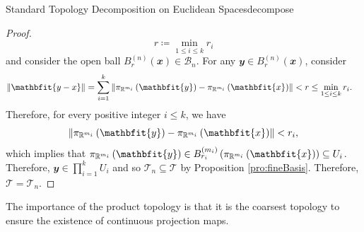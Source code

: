 \documentclass[math]{amznotes}
\theoremstyle{remark}
\begin{document}
\begin{probox}{Standard Topology Decomposition on Euclidean Spaces}{decompose}
\begin{proof}
        \begin{equation*}
            r \coloneqq \min_{1 \leq i \leq k}r_i
        \end{equation*}
        and consider the open ball $B_r^{\left(n\right)}\left(\mathbfit{x}\right) \in \mathcal{B}_n$. For any $\mathbfit{y} \in B_r^{\left(n\right)}\left(\mathbfit{x}\right)$, consider 
        \begin{align*}
            \norm{\mathbfit{y - x}} & = \sum_{i = 1}^{k}\norm{\pi_{\R^{m_i}}\left(\mathbfit{y}\right) - \pi_{\R^{m_i}}\left(\mathbfit{x}\right)} < r \leq \min_{1 \leq i \leq k}r_i.
        \end{align*}
        Therefore, for every positive integer $i \leq k$, we have 
        \begin{equation*}
            \norm{\pi_{\R^{m_i}}\left(\mathbfit{y}\right) - \pi_{\R^{m_i}}\left(\mathbfit{x}\right)} < r_i,
        \end{equation*}
        which implies that $\pi_{\R^{m_i}}\left(\mathbfit{y}\right) \in B_{r_i}^{\left(m_i\right)}\left(\pi_{\R^{m_i}}\left(\mathbfit{x}\right)\right) \subseteq U_i$. Therefore, $\mathbfit{y} \in \prod_{i = 1}^{k}U_i$ and so $\mathcal{T}_n \subseteq \mathcal{T}$ by Proposition \ref{pro:fineBasis}. Therefore, $\mathcal{T} = \mathcal{T}_n$.
    \end{proof}
\end{probox}
The importance of the product topology is that it is the coarsest topology to ensure the existence of continuous projection maps.
\end{document}
